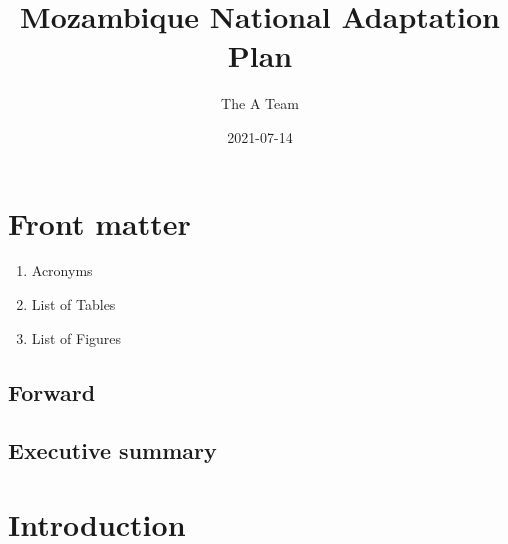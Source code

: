 \documentclass[
]{book}
\title{Mozambique National Adaptation Plan}
\author{The A Team}
\date{2021-07-14}
\providecommand{\tightlist}{%
  \setlength{\itemsep}{0pt}\setlength{\parskip}{0pt}}
\begin{document}
\maketitle

{
\setcounter{tocdepth}{1}
\tableofcontents
}
\hypertarget{front-matter}{%
\chapter{Front matter}\label{front-matter}}

\begin{enumerate}
\def\labelenumi{\alph{enumi}.}
\tightlist
\item
  Acronyms
\item
  List of Tables
\item
  List of Figures
\end{enumerate}

\hypertarget{forward}{%
\section{Forward}\label{forward}}

\hypertarget{executive-summary}{%
\section{Executive summary}\label{executive-summary}}

\hypertarget{introduction}{%
\chapter{Introduction}\label{introduction}}
\end{document}
